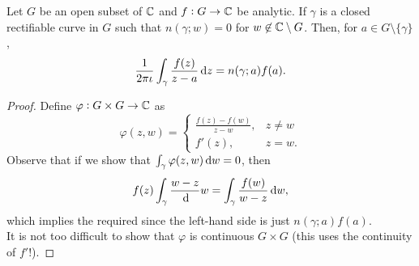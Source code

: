 	\begin{ftheo}
		Let $G$ be an open subset of $\mathbb{C}$ and $f : G \to \mathbb{C}$ be analytic. If $\gamma$ is a closed rectifiable curve in $G$ such that $n(\gamma;w) = 0$ for $w \not\in \mathbb{C}\setminus G$. Then, for $a \in G\setminus\{\gamma\}$,
		\[ \frac{1}{2\pi\iota} \int_\gamma \frac{f(z)}{z-a} \dif z = n(\gamma;a) f(a). \]
	\end{ftheo}
	\begin{proof}
		Define $\varphi : G \times G \to \mathbb{C}$ as
		\[ \varphi(z,w) =
			\begin{cases}
				\frac{f(z) - f(w)}{z-w}, & z\ne w \\
				f'(z), & z=w.
			\end{cases}
		\]
		Observe that if we show that $\int_\gamma \varphi(z,w) \dif w = 0$, then
		\[ f(z) \int_\gamma \frac{w-z} \dif w = \int_\gamma \frac{f(w)}{w-z} \dif w, \]
		which implies the required since the left-hand side is just $n(\gamma;a) f(a)$.\\
		It is not too difficult to show that $\varphi$ is continuous $G\times G$ (this uses the continuity of $f'$!). 
	\end{proof}